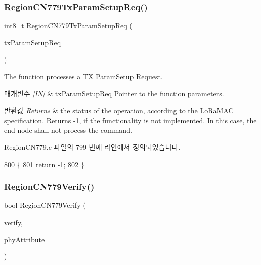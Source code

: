 \subsubsection{\texorpdfstring{Region\+C\+N779\+Tx\+Param\+Setup\+Req()}{RegionCN779TxParamSetupReq()}}
{\footnotesize\ttfamily int8\+\_\+t Region\+C\+N779\+Tx\+Param\+Setup\+Req (\begin{DoxyParamCaption}\item[{\mbox{\hyperlink{group___r_e_g_i_o_n_ga26836ef2996e70410e42ef471073f855}{Tx\+Param\+Setup\+Req\+Params\+\_\+t}} $\ast$}]{tx\+Param\+Setup\+Req }\end{DoxyParamCaption})}



The function processes a TX Param\+Setup Request. 


\begin{DoxyParams}{매개변수}
{\em \mbox{[}\+I\+N\mbox{]}} & tx\+Param\+Setup\+Req Pointer to the function parameters.\\
\hline
\end{DoxyParams}

\begin{DoxyRetVals}{반환값}
{\em Returns} & the status of the operation, according to the Lo\+Ra\+M\+AC specification. Returns -\/1, if the functionality is not implemented. In this case, the end node shall not process the command. \\
\hline
\end{DoxyRetVals}


Region\+C\+N779.\+c 파일의 799 번째 라인에서 정의되었습니다.


\begin{DoxyCode}
800 \{
801     \textcolor{keywordflow}{return} -1;
802 \}
\end{DoxyCode}
\mbox{\label{group___r_e_g_i_o_n_c_n779_ga7108626b64685883842049a36d865208}} 
\subsubsection{\texorpdfstring{Region\+C\+N779\+Verify()}{RegionCN779Verify()}}
{\footnotesize\ttfamily bool Region\+C\+N779\+Verify (\begin{DoxyParamCaption}\item[{\mbox{\hyperlink{group___r_e_g_i_o_n_ga966d97bc2f25df1c09e92e60ef652276}{Verify\+Params\+\_\+t}} $\ast$}]{verify,  }\item[{\mbox{\hyperlink{group___r_e_g_i_o_n_ga9445b07fdf77581ecfaf389970e635f8}{Phy\+Attribute\+\_\+t}}}]{phy\+Attribute }\end{DoxyParamCaption})}



